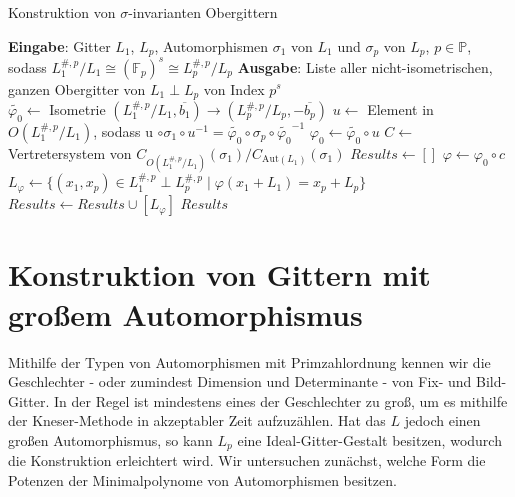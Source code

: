\documentclass[12pt,a4paper,halfparskip,headsepline,bibtotocnumbered]{scrreprt}
\theoremstyle{nummermitklammern}
\theoremstyle{nonumberbreak}
\newcommand{\F}{\mathbb{F}}
\renewcommand{\P}{\mathbb{P}}
\begin{document}
\begin{algorithm}[H]
	\caption{Konstruktion von $\sigma$-invarianten Obergittern}\label{alg:superlat}
	\begin{algorithmic}[1]
		\State \textbf{Eingabe}: Gitter $L_1$, $L_p$, Automorphismen $\sigma_1$ von $L_1$ und $\sigma_p$ von $L_p$, $p \in \P$, sodass $L_1^{\#,p}/L_1 \cong (\F_p)^s \cong L_p^{\#,p}/L_p$
		\State \textbf{Ausgabe}: Liste aller nicht-isometrischen, ganzen Obergitter von $L_1 \perp L_p$ von Index $p^s$
		\\
		\State $\tilde{\varphi_0} \gets$ Isometrie $(L_1^{\#,p} / L_1, \overline{b_1}) \rightarrow (L_p^{\#,p} / L_p, -\overline{b_p})$
		\State $u \gets$ Element in $O(L_1^{\#,p}/L_1)$, sodass u $\circ \sigma_1 \circ u^{-1} = \tilde{\varphi_0} \circ \sigma_p \circ \tilde{\varphi_0}^{-1}$
		\State $\varphi_0 \gets \tilde{\varphi_0} \circ u$
		\State $C \gets$ Vertretersystem von $C_{O(L_1^{\#,p} / L_1)}(\sigma_1) / C_{\text{Aut}(L_1)}(\sigma_1)$
		\State $Results \gets []$
			\State $\varphi \gets \varphi_0 \circ c$
			\State $L_\varphi \gets \lbrace (x_1,x_p) \in L_1^{\#,p} \perp L_p^{\#,p} \mid \varphi(x_1+L_1) = x_p + L_p \rbrace$
				\State $Results \gets Results \cup [L_\varphi]$
			\EndIf
		\EndFor
		\State \Return $Results$
	\end{algorithmic}
\end{algorithm}



\section{Konstruktion von Gittern mit großem Automorphismus}

Mithilfe der Typen von Automorphismen mit Primzahlordnung kennen wir die Geschlechter - oder zumindest Dimension und Determinante - von Fix- und Bild-Gitter. In der Regel ist mindestens eines der Geschlechter zu groß, um es mithilfe der Kneser-Methode in akzeptabler Zeit aufzuzählen. Hat das $L$ jedoch einen großen Automorphismus, so kann $L_p$ eine Ideal-Gitter-Gestalt besitzen, wodurch die Konstruktion erleichtert wird. Wir untersuchen zunächst, welche Form die Potenzen der Minimalpolynome von Automorphismen besitzen.
\end{document}
